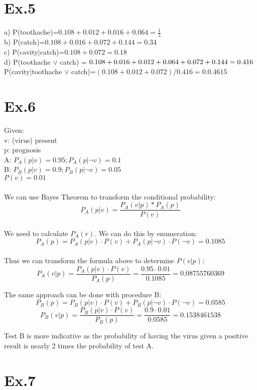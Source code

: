 \documentclass[11pt]{article}
\begin{document}
\section*{Ex.5}
a) P(toothache)=$0.108+0.012+0.016+0.064=\frac{1}{5}$\\
b) P(catch)=$0.108+0.016+0.072+0.144=0.34$\\
c) P(cavity$|$catch)=$0.108+0.072=0.18$\\
d) P(toothache $\vee$ catch) = $0.108+0.016+0.012+0.064+0.072+0.144=0.416\\
$P(cavity$|$toothache $\vee$ catch)=$(0.108+0.012+0.072)/0.416=0.0.4615$\\

\section*{Ex.6}

Given:\\
v: (virus) present\\
p: prognosis\\
A: $P_A(p|v)=0.95; P_A(p|\neg v)=0.1$\\
B: $P_B(p|v)=0.9; P_B(p|\neg v)=0.05$\\
$P(v)=0.01$\\
\\
We can use Bayes Theorem to transform the conditional probability: \\
$$P_A(p|v)=\frac{P_A(v|p)*P_A(p)}{P(v)}$$ \\
We need to calculate $P_A(r)$. We can do this by enumeration: \\
$$P_A(p) = P_A(p|v) \cdot P(v) + P_A(p|\neg v) \cdot P(\neg v) = 0.1085$$ \\
Thus we can transform the formula above to determine  $P(v|p)$: \\
$$P_A(v|p) = \frac{P_A(p|v) \cdot P(v)}{P_A(p)} = \frac{0.95 \cdot 0.01}{0.1085} = 0.08755760369 $$

The same approach can be done with procedure B:
$$P_B(p) = P_B(p|v) \cdot P(v) + P_B(p|\neg v) \cdot P(\neg v) = 0.0585 $$
$$P_B(v|p) = \frac{P_B(p|v) \cdot P(v)}{P_B(p)} = \frac{0.9 \cdot 0.01}{0.0585} = 0.1538461538$$

\noindent
Test B is more indicative as the probability of having the virus given a positive result is nearly 2 times the probability of test A.

\section*{Ex.7}
\end{document}
